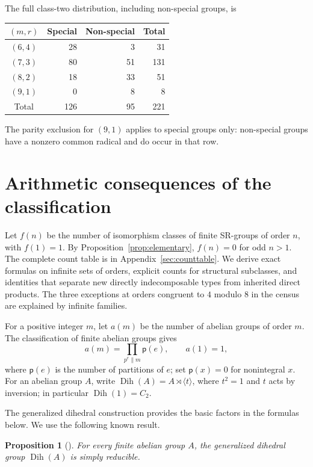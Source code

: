 \documentclass[11pt,a4paper]{amsart}
\newtheorem{prop}[thm]{Proposition}
\theoremstyle{definition}
\theoremstyle{remark}
\numberwithin{equation}{section}
\begin{document}
The full class-two distribution, including non-special groups, is
\begin{center}
\begin{tabular}{@{}crrr@{}}\toprule
$(m,r)$ & Special & Non-special & Total\\\midrule
$(6,4)$&28&3&31\\
$(7,3)$&80&51&131\\
$(8,2)$&18&33&51\\
$(9,1)$&0&8&8\\\midrule
Total&126&95&221\\\bottomrule
\end{tabular}
\end{center}
The parity exclusion for $(9,1)$ applies to special groups only:
non-special groups have a nonzero common radical and do occur in that row.


\section{Arithmetic consequences of the classification}\label{sec:count-patterns}
Let $f(n)$ be the number of isomorphism classes of finite SR-groups of
order $n$, with $f(1)=1$. By Proposition~\ref{prop:elementary}, $f(n)=0$ for odd $n>1$.
The complete count table is in Appendix~\ref{sec:counttable}. We derive exact formulas on infinite sets of orders, explicit counts
for structural subclasses, and identities that separate new directly
indecomposable types from inherited direct products. The three
exceptions at orders congruent to $4$ modulo $8$ in the census
are explained by infinite families.

For a positive integer $m$, let $a(m)$ be the number of abelian
groups of order $m$. The classification of finite abelian groups gives
\begin{equation}\label{eq:abelian-partitions}
 a(m)=\prod_{p^e\parallel m}\mathsf p(e),\qquad a(1)=1,
\end{equation}
where $\mathsf p(e)$ is the number of partitions of $e$; set
$\mathsf p(x)=0$ for nonintegral $x$.
For an abelian group $A$, write
$\operatorname{Dih}(A)=A\rtimes\langle t\rangle$, where $t^2=1$ and
$t$ acts by inversion; in particular $\operatorname{Dih}(1)=C_2$.

The generalized dihedral construction provides the basic factors in the
formulas below. We use the following known result.
\begin{prop}[{\cite[Theorems~4.4 and~4.7]{GPPRV25}}]
\label{prop:generalized-dihedral-sr}
For every finite abelian group $A$, the generalized dihedral group
$\operatorname{Dih}(A)$ is simply reducible.
\end{prop}
\end{document}
